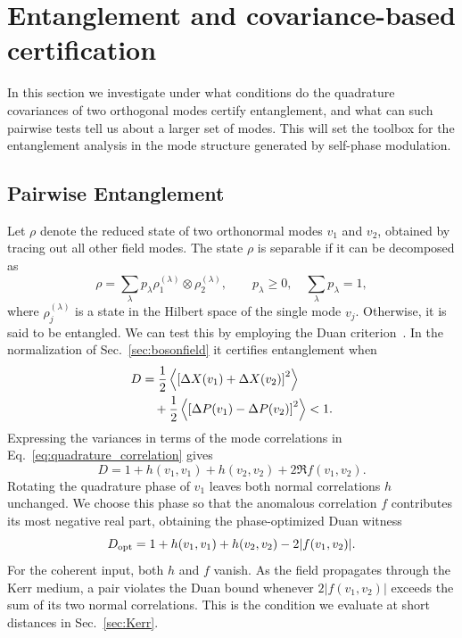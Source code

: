 \documentclass[%
 reprint,
 amsmath,amssymb,
 aps,
pra,
twocolumn,
]{revtex4-2}
\begin{document}
\section{Entanglement and covariance-based certification}
\label{sec:entanglement}

In this section we investigate under what conditions do the quadrature covariances of two orthogonal modes certify entanglement, and what can such pairwise tests tell us about a larger set of modes. This will set the toolbox for the entanglement analysis in the mode structure generated by self-phase modulation.

\subsection{Pairwise Entanglement}
\label{sec:duan}

Let $\rho$ denote the reduced state of two orthonormal modes $v_1$ and $v_2$, obtained by tracing out all other field modes. The state $\rho$ is separable if it can be decomposed as
\begin{equation}
    \rho=\sum_\lambda p_\lambda
        \rho_1^{(\lambda)}\otimes\rho_2^{(\lambda)},
    \qquad p_\lambda\ge0,\quad \sum_\lambda p_\lambda=1,
\end{equation}
where $\rho_j^{(\lambda)}$ is a state in the Hilbert space of the single mode $v_j$. Otherwise, it is said to be entangled. We can test this by employing the Duan criterion~\cite{duan2000inseparability, PhysRevLett.84.2726}. In the normalization of Sec.~\ref{sec:bosonfield} it certifies entanglement when
\begin{equation}
    \begin{aligned}
        D &= \frac{1}{2}\expval{\left[\Delta X(v_1)+\Delta X(v_2)\right]^2}\\
          &\quad+\frac{1}{2}\expval{\left[\Delta P(v_1)-\Delta P(v_2)\right]^2}<1.
    \end{aligned}
    \label{eq:duan_criterion}
\end{equation}
Expressing the variances in terms of the mode correlations in Eq.~\eqref{eq:quadrature_correlation} gives
\begin{equation}
    D=1+h(v_1,v_1)+h(v_2,v_2)+2\Re f(v_1,v_2).
\end{equation}
Rotating the quadrature phase of $v_1$ leaves both normal correlations $h$ unchanged. We choose this phase so that the anomalous correlation $f$ contributes its most negative real part, obtaining the phase-optimized Duan witness
\begin{equation}
    \label{eq:optimized_duan}
    D_{\mathrm{opt}}=1+h(v_1,v_1)+h(v_2,v_2)-2\abs{f(v_1,v_2)}.
\end{equation}
For the coherent input, both $h$ and $f$ vanish. As the field propagates through the Kerr medium, a pair violates the Duan bound whenever $2|f(v_1,v_2)|$ exceeds the sum of its two normal correlations. This is the condition we evaluate at short distances in Sec.~\ref{sec:Kerr}.
\end{document}
